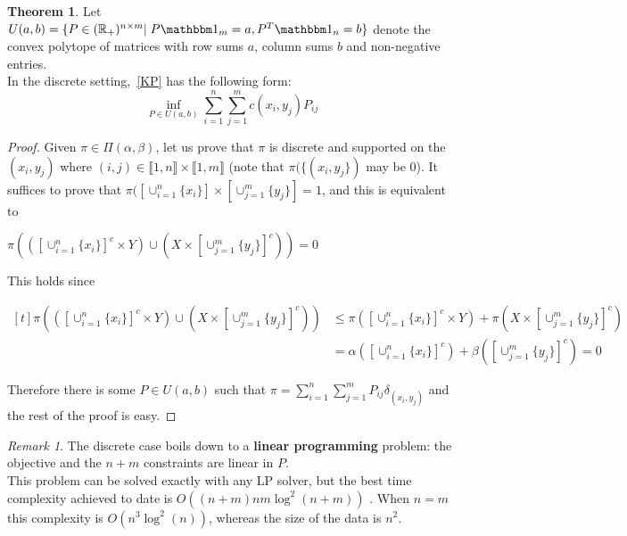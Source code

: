 \documentclass[12pt]{report}
\theoremstyle{definition}
\newtheorem{thm}[defi]{Theorem}
\theoremstyle{remark}
\newtheorem{rem}[defi]{Remark}
\begin{document}
\begin{thm}\label{discrete}
	Let $U(a,b)=\{P\in (\mathbb R_+)^{n\times m}|\; P \mathbbm 1_m =a, P^T \mathbbm 1_n =b \}$ denote the convex polytope of matrices with row sums $a$, column sums $b$ and non-negative entries.\\
	In the discrete setting,~\eqref{KP} has the following form:
	\begin{equation*}
	\inf_{P\in U(a,b)} \sum_{i=1}^n\sum_{j=1}^m c(x_i,y_j)P_{ij}
	\end{equation*}
\end{thm}

\begin{proof}
	Given $\pi \in \Pi(\alpha, \beta)$, let us prove that $\pi$ is discrete and supported on the $(x_i,y_j)$ where $(i,j) \in \llbracket 1,n \rrbracket\times \llbracket 1,m \rrbracket$ (note that $\pi(\{(x_i,y_j\})$ may be $0$). It suffices to prove that $\pi([\cup_{i=1}^n \{x_i\}]\times [\cup_{j=1}^m \{y_j\}]=1$, and this is equivalent to \begin{center}$\pi(\left([\cup_{i=1}^n \{x_i\}]^c\times Y\right)\cup \left(X\times [\cup_{j=1}^m \{y_j\}]^c\right))=0$\end{center}
	This holds since \begin{center}
		$\begin{aligned}[t]\pi(\left([\cup_{i=1}^n \{x_i\}]^c\times Y\right)\cup \left(X\times [\cup_{j=1}^m \{y_j\}]^c\right)) &\leq \pi([\cup_{i=1}^n \{x_i\}]^c\times Y) + \pi(X\times [\cup_{j=1}^m \{y_j\}]^c) \\
		& = \alpha([\cup_{i=1}^n \{x_i\}]^c) + \beta([\cup_{j=1}^m \{y_j\}]^c) = 0
		\end{aligned}$
	\end{center}
	Therefore there is some $P\in U(a,b)$ such that $\pi = \sum_{i=1}^n\sum_{j=1}^m P_{ij} \delta_{(x_i,y_j)} $ and the rest of the proof is easy.
\end{proof}

\begin{rem}
	The discrete case boils down to a \textbf{linear programming} problem: the objective and the $n+m$ constraints are linear in $P$.\\
	This problem can be solved exactly with any LP solver, but the best time complexity achieved to date is $O((n+m)nm \log^2(n+m))$ \cite[Section~3.5.3]{peyre2019computational}. When $n=m$ this complexity is $O(n^3\log^2(n))$, whereas the size of the data is $n^2$.
\end{rem}
\end{document}
